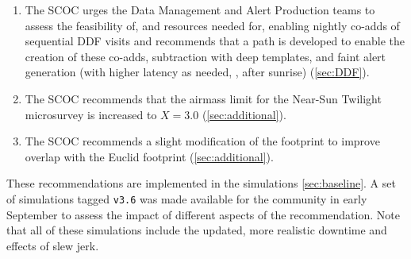 \begin{enumerate}
\item The SCOC urges the Data Management and Alert Production teams to assess the feasibility of, and resources needed for, enabling nightly co-adds of sequential DDF visits and recommends that a path is developed to enable the creation of these co-adds, subtraction with deep templates, and faint alert generation (with higher latency as needed, \eg , after sunrise) (\autoref{sec:DDF}). 

\item The SCOC recommends that the airmass limit for the Near-Sun Twilight microsurvey is increased to $X=3.0$ (\autoref{sec:additional}).

\item The SCOC recommends a slight modification of the  footprint to improve overlap with the Euclid footprint (\autoref{sec:additional}). 

\end{enumerate}

These recommendations are implemented in the  simulations \autoref{sec:baseline}. A set of simulations tagged \texttt{v3.6} was made available for the community in early September to assess the impact of different aspects of the recommendation. Note that all of these simulations include the updated, more realistic downtime and effects of slew jerk. 

